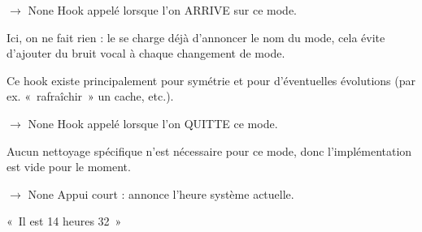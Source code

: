 \documentclass[letterpaper,10pt,french]{sphinxmanual}
\begin{document}
\begin{fulllineitems}

\begin{fulllineitems}
\label{\detokenize{api/modes:modes.mode_datetime.ModeDateHeure.on_enter}}
\pysigstartsignatures
\pysiglinewithargsret
{}
{}
{{ $\rightarrow$ None}}
\pysigstopsignatures
\sphinxAtStartPar
Hook appelé lorsque l’on ARRIVE sur ce mode.

\sphinxAtStartPar
Ici, on ne fait rien :
\sphinxhyphen{} le  se charge déjà d’annoncer le nom du mode,
\sphinxhyphen{} cela évite d’ajouter du bruit vocal à chaque changement de mode.

\sphinxAtStartPar
Ce hook existe principalement pour symétrie et pour d’éventuelles
évolutions (par ex. « rafraîchir » un cache, etc.).

\end{fulllineitems}


\begin{fulllineitems}
\label{\detokenize{api/modes:modes.mode_datetime.ModeDateHeure.on_exit}}
\pysigstartsignatures
\pysiglinewithargsret
{}
{}
{{ $\rightarrow$ None}}
\pysigstopsignatures
\sphinxAtStartPar
Hook appelé lorsque l’on QUITTE ce mode.

\sphinxAtStartPar
Aucun nettoyage spécifique n’est nécessaire pour ce mode, donc
l’implémentation est vide pour le moment.

\end{fulllineitems}


\begin{fulllineitems}
\label{\detokenize{api/modes:modes.mode_datetime.ModeDateHeure.on_short_press}}
\pysigstartsignatures
\pysiglinewithargsret
{}
{}
{{ $\rightarrow$ None}}
\pysigstopsignatures
\sphinxAtStartPar
Appui court : annonce l’heure système actuelle.
\begin{description}
\sphinxAtStartPar
« Il est 14 heures 32 »


\end{description}
\end{fulllineitems}
\end{fulllineitems}
\end{document}
